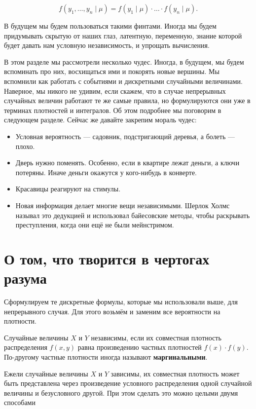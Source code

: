 \documentclass[12pt, a4paper, oneside]{extreport}
\newcommand{\indef}[1]{\textbf{#1}}     %
\theoremstyle{plain}              %
\theoremstyle{definition}         %
\begin{document}
 \[ f(y_1, \ldots, y_n \mid \mu) = f(y_1 \mid \mu) \cdot \ldots \cdot f(y_n \mid \mu). \] 

В будущем мы будем пользоваться такими финтами. Иногда мы будем придумывать скрытую от наших глаз, латентную, переменную, знание которой будет давать нам условную независимость, и упрощать вычисления.

В этом разделе мы рассмотрели несколько чудес. Иногда, в будущем, мы будем вспоминать про них, восхищаться ими и покорять новые вершины. Мы вспомнили как работать с событиями и дискретными случайными величинами. Наверное, мы никого не удивим, если скажем, что в случае непрерывных случайных величин работают те же самые правила, но формулируются они уже в терминах плотностей и интегралов.  Об этом подробнее мы поговорим в следующем разделе. Сейчас же давайте закрепим мораль чудес: 

\begin{itemize}
	\item  Условная вероятность --- садовник, подстригающий деревья, а болеть --- плохо.
	\item  Дверь нужно поменять. Особенно, если в квартире лежат деньги, а ключи потеряны. Иначе деньги окажутся у кого-нибудь в конверте.
	\item  Красавицы реагируют на стимулы.
	\item  Новая информация делает многие вещи независимыми. Шерлок Холмс называл это дедукцией и использовал байесовские методы, чтобы раскрывать преступления, когда они ещё не были мейнстримом. 
\end{itemize}

\section{О том, что творится в чертогах разума}

Сформулируем те дискретные формулы, которые мы использовали выше, для непрерывного случая. Для этого возьмём и заменим все вероятности на плотности.

Случайные величины $X$ и $Y$ независимы, если их совместная плотность распределения $f(x,y)$ равна произведению частных плотностей $f(x) \cdot f(y)$. По-другому частные плотности иногда называют \indef{маргинальными}.

Ежели случайные величины $X$ и $Y$ зависимы, их совместная плотность может быть представлена через произведение условного распределения одной случайной величины и безусловного другой. При этом сделать это можно целыми двумя способами
\end{document}
